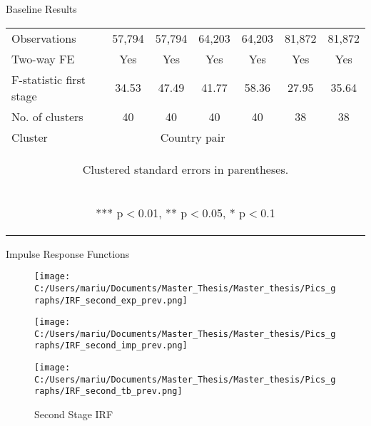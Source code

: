 \documentclass[11pt]{beamer}
\begin{document}
\begin{frame}{Baseline Results}
\begin{table}[htbp]
{\begin{tabular}{lcccccc}
Observations & 57,794 & 57,794 & 64,203 & 64,203 & 81,872 & 81,872 \\
Two-way FE & Yes & Yes & Yes & Yes & Yes & Yes \\
F-statistic first stage & 34.53 & 47.49 & 41.77 & 58.36 & 27.95 & 35.64 \\
No. of clusters & 40 & 40 & 40 & 40 & 38 & 38 \\
Cluster & &\multicolumn{2}{c}{Country pair} \\ \hline
\multicolumn{7}{c}{\begin{footnotesize} Clustered standard errors in parentheses. \end{footnotesize} }\\
\multicolumn{7}{c}{\begin{footnotesize} *** p$<$0.01, ** p$<$0.05, * p$<$0.1\end{footnotesize}} \\\end{tabular}
}
\end{table}
\end{frame}

\begin{frame}{Impulse Response Functions}
\begin{figure}[!ht]
\begin{center}
\begin{minipage}[t]{\textwidth}
\begin{minipage}[t]{0.3\linewidth}\vspace{0pt} 
\texttt{[image: C:/Users/mariu/Documents/Master\_Thesis/Master\_thesis/Pics\_graphs/IRF\_second\_exp\_prev.png]}\\
\end{minipage}\hfill%
\begin{minipage}[t]{0.3\linewidth}\vspace{0pt} 
\texttt{[image: C:/Users/mariu/Documents/Master\_Thesis/Master\_thesis/Pics\_graphs/IRF\_second\_imp\_prev.png]}\\
\end{minipage}\hfill%
\begin{minipage}[t]{0.3\linewidth}\vspace{0pt} 
\texttt{[image: C:/Users/mariu/Documents/Master\_Thesis/Master\_thesis/Pics\_graphs/IRF\_second\_tb\_prev.png]}\\
\end{minipage}\hfill%
\caption{Second Stage IRF\label{Second Stage IRF}}
\end{minipage}
\end{center}
\end{figure}
\end{frame}
\end{document}
